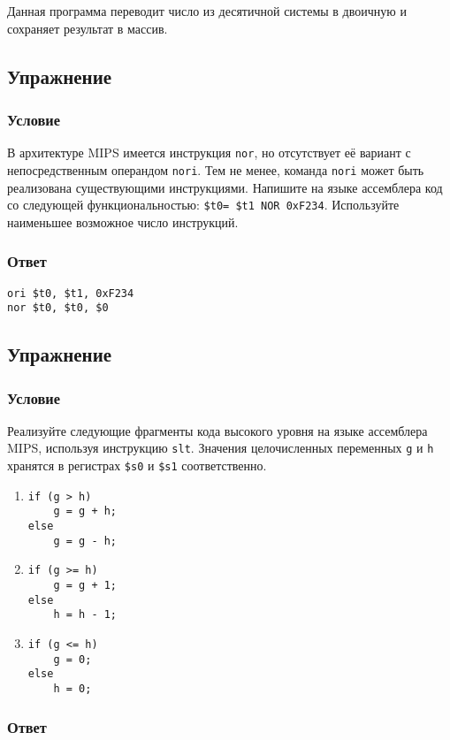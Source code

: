 \documentclass[12pt]{article}
\newenvironment{e}[1][dummy label]{
    \subsection{Упражнение}\label{#1}
    \subsubsection*{Условие}
    }{
    \subsubsection*{Ответ}
}
\begin{document}
    Данная программа переводит число из десятичной системы в двоичную и сохраняет результат в массив.

    \newpage

    \begin{e}
        В архитектуре MIPS имеется инструкция \texttt{nor}, но отсутствует её вариант с непосредственным операндом \texttt{nori}. Тем не менее, команда \texttt{nori} может быть реализована существующими инструкциями. Напишите на языке ассемблера код со следующей функциональностью: \texttt{\$t0= \$t1 NOR 0xF234}. Используйте наименьшее возможное число инструкций.
    \end{e}

    \begin{verbatim}
ori $t0, $t1, 0xF234
nor $t0, $t0, $0
    \end{verbatim}

    \begin{e}
        Реализуйте следующие фрагменты кода высокого уровня на языке ассемблера MIPS, используя инструкцию \texttt{slt}. Значения целочисленных переменных \texttt{g} и \texttt{h} хранятся в регистрах \texttt{\$s0} и \texttt{\$s1} соответственно.
        \begin{enumerate}
            \item
            \begin{verbatim}
if (g > h)
    g = g + h;
else
    g = g - h;
            \end{verbatim}

            \item
            \begin{verbatim}
if (g >= h)
    g = g + 1;
else
    h = h - 1;
            \end{verbatim}

            \item
            \begin{verbatim}
if (g <= h)
    g = 0;
else
    h = 0;
            \end{verbatim}
        \end{enumerate}
    \end{e}
\end{document}

